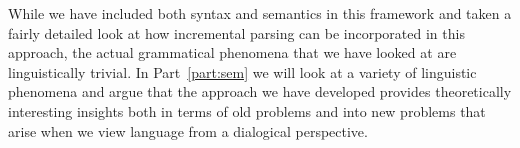 While we have included both syntax and semantics in this framework and
taken a fairly detailed look at how incremental parsing can be
incorporated in this approach, the actual grammatical phenomena that
we have looked at are linguistically trivial. In Part~\ref{part:sem}
we will look at a variety of linguistic phenomena and argue that the
approach we have developed provides theoretically interesting insights
both in terms of old problems and into new problems that arise when we
view language from a dialogical perspective.



